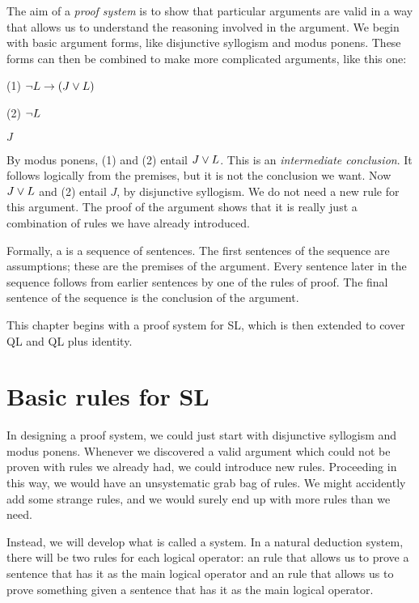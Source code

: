 The aim of a \emph{proof system} is to show that particular arguments are valid in a way that allows us to understand the reasoning involved in the argument. We begin with basic argument forms, like disjunctive syllogism and modus ponens. These forms can then be combined to make more complicated arguments, like this one:
\begin{earg}
\item[(1)] $\neg L \rightarrow (J \vee L)$
\item[(2)] $\neg L$
\item[\therefore] $J$
\end{earg}
By modus ponens, (1) and (2) entail $J \vee L$. This is an \emph{intermediate conclusion}. It follows logically from the premises, but it is not the conclusion we want. Now $J \vee L$ and (2) entail $J$, by disjunctive syllogism. We do not need a new rule for this argument. The proof of the argument shows that it is really just a combination of rules we have already introduced.

Formally, a  is a sequence of sentences. The first sentences of the sequence are assumptions; these are the premises of the argument. Every sentence later in the sequence follows from earlier sentences by one of the rules of proof. The final sentence of the sequence is the conclusion of the argument.

This chapter begins with a proof system for SL, which is then extended to cover QL and QL plus identity.


\section{Basic rules for SL}

In designing a proof system, we could just start with disjunctive syllogism and modus ponens. Whenever we discovered a valid argument which could not be proven with rules we already had, we could introduce new rules. Proceeding in this way, we would have an unsystematic grab bag of rules. We might accidently add some strange rules, and we would surely end up with more rules than we need.

Instead, we will develop what is called a  system. In a natural deduction system, there will be two rules for each logical operator: an  rule that allows us to prove a sentence that has it as the main logical operator and an  rule that allows us to prove something given a sentence that has it as the main logical operator.

